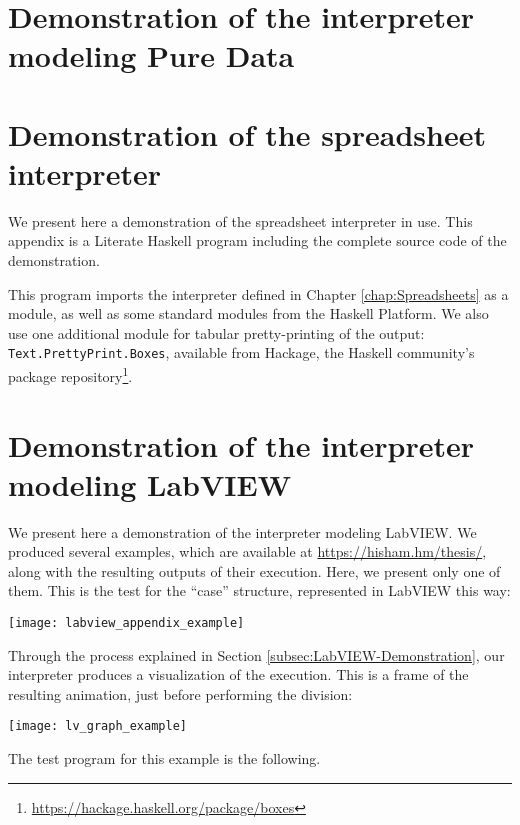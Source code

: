 \appendix

\chapter{Demonstration of the interpreter modeling Pure Data\label{appendix:Pure-Data}}




\chapter{Demonstration of the spreadsheet interpreter\label{appendix:Spreadsheet}}


We present here a demonstration of the spreadsheet interpreter in
use. This appendix is a Literate Haskell program including the complete
source code of the demonstration.

This program imports the interpreter defined in Chapter \ref{chap:Spreadsheets}
as a module, as well as some standard modules from the Haskell Platform.
We also use one additional module for tabular pretty-printing of the
output: \texttt{Text.PrettyPrint.Boxes}, available from Hackage, the
Haskell community's package repository\footnote{\url{https://hackage.haskell.org/package/boxes}}.



\chapter{Demonstration of the interpreter modeling LabVIEW\label{appendix:LabVIEW}}


We present here a demonstration of the interpreter modeling LabVIEW.
We produced several examples, which are available at $ $\url{https://hisham.hm/thesis/},
along with the resulting outputs of their execution. Here, we present
only one of them. This is the test for the ``case'' structure, represented
in LabVIEW this way:

\begin{center}
\texttt{[image: labview\_appendix\_example]}
\par\end{center}

Through the process explained in Section \ref{subsec:LabVIEW-Demonstration},
our interpreter produces a visualization of the execution. This is
a frame of the resulting animation, just before performing the division:

\noindent \texttt{[image: lv\_graph\_example]}

\noindent The test program for this example is the following.


